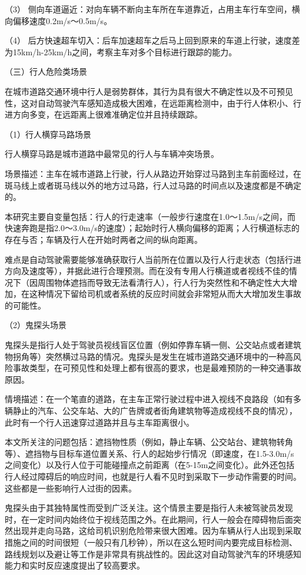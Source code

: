 （3） 侧向车道逼近：对向车辆不断向主车所在车道靠近，占用主车行车空间，横向偏移速度0.2m/s～0.5m/s。

（4） 后方快速超车切入：后车加速超车之后马上回到原来的车道上行驶，速度差为15km/h-25km/h之间，考察主车对多个目标进行跟踪的能力。

（三）行人危险类场景

在城市道路交通环境中行人是弱势群体，其行为具有很大不确定性以及不可预见性，这对自动驾驶汽车感知造成极大困难，在远距离检测中，由于行人体积小、行进方向多变，在远距离上很难准确定位并且持续跟踪。

（1）行人横穿马路场景

行人横穿马路是城市道路中最常见的行人与车辆冲突场景。

场景描述：主车在城市道路上行驶，行人从路边开始穿过马路到主车前面经过，在斑马线上或者斑马线以外的地方过马路，行人过马路的时间点以及速度都是不确定的。

本研究主要自变量包括：行人的行走速率（一般步行速度在1.0～1.5m/s之间，而快速奔跑是指2.0～3.0m/s的速度）；起始时行人横向偏移的距离；人行横道标志的存在与否；车辆及行人在开始时两者之间的纵向距离。

难点是自动驾驶需要能够准确获取行人当前所在位置以及行人行走状态（包括行进方向及速度等），并据此进行合理预测。而在没有专用人行横道或者视线不佳的情况下（因周围物体遮挡而导致无法看清行人），行人行为突然性和不确定性大大增加，在这种情况下留给司机或者系统的反应时间就会非常短从而大大增加发生事故的可能性。

（2）鬼探头场景

鬼探头是指行人处于驾驶员视线盲区位置（例如停靠车辆一侧、公交站点或者建筑物拐角等）突然横过马路的情况。鬼探头是发生在城市道路交通环境中的一种高风险事故类型，在可预见性和处理上都有很高的要求，也是最难预防的一种交通事故原因。

情境描述：在一个笔直的道路，在主车正常行驶过程中进入视线不良路段（如有多辆静止的汽车、公交车站、大的广告牌或者街角建筑物等造成视线不良的情况），此时有一个行人迅速穿过道路并且与主车距离很小。

本文所关注的问题包括：遮挡物性质（例如，静止车辆、公交站台、建筑物转角等）、遮挡物与目标车道位置关系、行人的起始步行情况（即速度，在1.5-3.0m/s之间变化）以及行人位于可能碰撞点之前距离（在5-15m之间变化）。此外还包括行人经过障碍后的响应时间，也就是行人看不见时到采取下一步动作需要的时间。这些都是一些影响行人过街的因素。

鬼探头由于其独特属性而受到广泛关注。这个情景主要是指行人未被驾驶员发现时，在一定时间内始终位于视线范围之外。在此期间，行人一般会在障碍物后面突然出现并走向马路，这给司机识别危险带来很大困难。因为车辆从行人出现到采取措施之间的时间很短（一般只有几秒钟），所以在这么短时间内要完成目标检测、路线规划以及避让等工作是非常具有挑战性的。因此这对自动驾驶汽车的环境感知能力和实时反应速度提出了较高要求。

